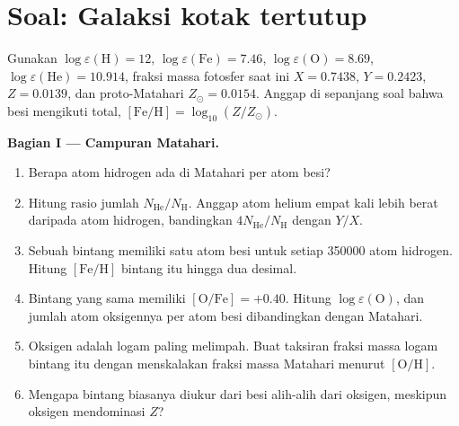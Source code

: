 \section{Soal: Galaksi kotak tertutup}

\begin{problem}
\label{pb:b3:origin-of-elements:1}
Gunakan $\log\varepsilon(\mathrm{H}) = 12$, 
$\log\varepsilon(\mathrm{Fe}) = 7.46$, $\log\varepsilon(\mathrm{O}) =
8.69$, $\log\varepsilon(\mathrm{He}) = 10.914$, fraksi massa
fotosfer saat ini $X = 0.7438$, $Y = 0.2423$, $Z = 0.0139$,
dan proto-Matahari $Z_\odot = 0.0154$. Anggap di sepanjang soal bahwa besi
mengikuti  total, $[\mathrm{Fe/H}] = \log_{10}(Z/Z_\odot)$.

\medskip\noindent\textbf{Bagian I --- Campuran Matahari.}
\begin{enumerate}
\item Berapa atom hidrogen ada di Matahari per atom besi?
\item Hitung rasio jumlah $N_\mathrm{He}/N_\mathrm{H}$. Anggap atom helium
  empat kali lebih berat daripada atom hidrogen, bandingkan
  $4N_\mathrm{He}/N_\mathrm{H}$ dengan $Y/X$.
\item Sebuah bintang memiliki satu atom besi untuk setiap \num{350000} atom hidrogen.
  Hitung $[\mathrm{Fe/H}]$ bintang itu hingga dua desimal.
\item Bintang yang sama memiliki $[\mathrm{O/Fe}] = +0.40$. Hitung
  $\log\varepsilon(\mathrm{O})$, dan jumlah atom oksigennya per atom besi
  dibandingkan dengan Matahari.
\item Oksigen adalah logam paling melimpah. Buat taksiran fraksi massa logam
  bintang itu dengan menskalakan fraksi massa Matahari menurut $[\mathrm{O/H}]$.
\item Mengapa  bintang biasanya diukur dari besi
  alih-alih dari oksigen, meskipun oksigen mendominasi $Z$?
\end{enumerate}


\end{problem}
